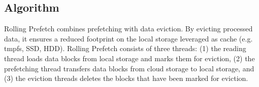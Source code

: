 \subsection{Algorithm}



Rolling Prefetch combines prefetching with data eviction. By evicting processed
data, it ensures a reduced footprint on the local storage leveraged as cache
(e.g. tmpfs, SSD, HDD). Rolling Prefetch consists of three threads: (1) the
reading thread loads data blocks from local storage and marks them for eviction,
(2) the prefetching thread transfers data blocks from cloud storage to local
storage, and (3) the eviction threads deletes the blocks that have been marked
for eviction.
    
    
    
        
        
